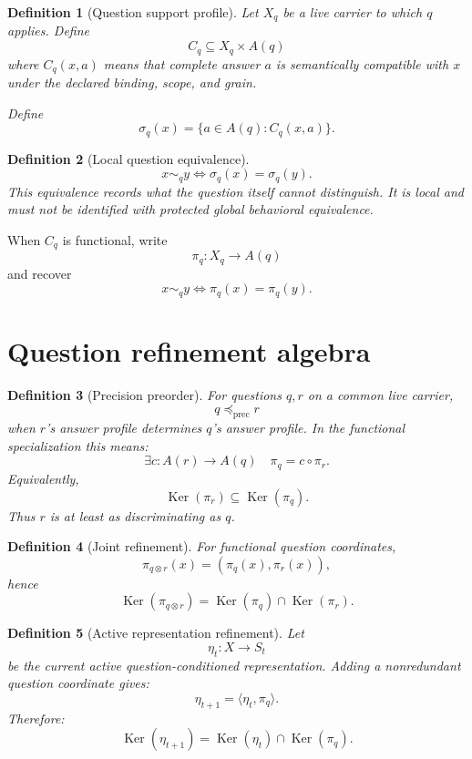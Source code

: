 \documentclass[11pt,oneside]{article}
\newtheorem{definition}{Definition}[section]
\newcommand{\Ker}{\operatorname{Ker}}
\begin{document}
\begin{definition}[Question support profile]
Let \(X_q\) be a live carrier to which \(q\) applies.  Define
\[
C_q\subseteq X_q\times A(q)
\]
where \(C_q(x,a)\) means that complete answer \(a\) is semantically compatible with \(x\) under the declared binding, scope, and grain.

Define
\[
\sigma_q(x)
=
\{a\in A(q):C_q(x,a)\}.
\]
\end{definition}

\begin{definition}[Local question equivalence]
\[
\boxed{
x\sim_q y
\iff
\sigma_q(x)=\sigma_q(y).
}
\]
This equivalence records what the question itself cannot distinguish.  It is local and must not be identified with protected global behavioral equivalence.
\end{definition}

When \(C_q\) is functional, write
\[
\pi_q:X_q\to A(q)
\]
and recover
\[
x\sim_q y\iff\pi_q(x)=\pi_q(y).
\]

\section{Question refinement algebra}

\begin{definition}[Precision preorder]
For questions \(q,r\) on a common live carrier,
\[
\boxed{
q\preceq_{\mathrm{prec}}r
}
\]
when \(r\)'s answer profile determines \(q\)'s answer profile.  In the functional specialization this means:
\[
\boxed{
\exists c:A(r)\to A(q)
\quad
\pi_q=c\circ\pi_r.
}
\]
Equivalently,
\[
\Ker(\pi_r)\subseteq\Ker(\pi_q).
\]
Thus \(r\) is at least as discriminating as \(q\).
\end{definition}

\begin{definition}[Joint refinement]
For functional question coordinates,
\[
\pi_{q\otimes r}(x)
=
(\pi_q(x),\pi_r(x)),
\]
hence
\[
\boxed{
\Ker(\pi_{q\otimes r})
=
\Ker(\pi_q)\cap\Ker(\pi_r).
}
\]
\end{definition}

\begin{definition}[Active representation refinement]
Let
\[
\eta_t:X\to S_t
\]
be the current active question-conditioned representation.  Adding a nonredundant question coordinate gives:
\[
\boxed{
\eta_{t+1}
=
\langle\eta_t,\pi_q\rangle.
}
\]
Therefore:
\[
\boxed{
\Ker(\eta_{t+1})
=
\Ker(\eta_t)\cap\Ker(\pi_q).
}
\]
\end{definition}
\end{document}
